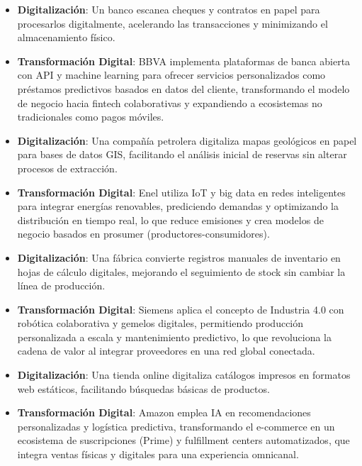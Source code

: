 \begin{itemize}
\item \textbf{Digitalización}: Un banco escanea cheques y contratos en papel para procesarlos digitalmente, acelerando las transacciones y minimizando el almacenamiento físico.
\item \textbf{Transformación Digital}: BBVA implementa plataformas de banca abierta con API y machine learning para ofrecer servicios personalizados como préstamos predictivos basados en datos del cliente, transformando el modelo de negocio hacia fintech colaborativas y expandiendo a ecosistemas no tradicionales como pagos móviles.
\end{itemize}

\begin{itemize}
\item \textbf{Digitalización}: Una compañía petrolera digitaliza mapas geológicos en papel para bases de datos GIS, facilitando el análisis inicial de reservas sin alterar procesos de extracción.
\item \textbf{Transformación Digital}: Enel utiliza IoT y big data en redes inteligentes para integrar energías renovables, prediciendo demandas y optimizando la distribución en tiempo real, lo que reduce emisiones y crea modelos de negocio basados en prosumer (productores-consumidores).
\end{itemize}

\begin{itemize}
\item \textbf{Digitalización}: Una fábrica convierte registros manuales de inventario en hojas de cálculo digitales, mejorando el seguimiento de stock sin cambiar la línea de producción.
\item \textbf{Transformación Digital}: Siemens aplica el concepto de Industria 4.0 con robótica colaborativa y gemelos digitales, permitiendo producción personalizada a escala y mantenimiento predictivo, lo que revoluciona la cadena de valor al integrar proveedores en una red global conectada.
\end{itemize}

\begin{itemize}
\item \textbf{Digitalización}: Una tienda online digitaliza catálogos impresos en formatos web estáticos, facilitando búsquedas básicas de productos.
\item \textbf{Transformación Digital}: Amazon emplea IA en recomendaciones personalizadas y logística predictiva, transformando el e-commerce en un ecosistema de suscripciones (Prime) y fulfillment centers automatizados, que integra ventas físicas y digitales para una experiencia omnicanal.
\end{itemize}

